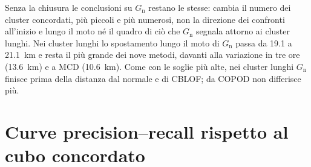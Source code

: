 Senza la chiusura le conclusioni su $G_{\mathrm{n}}$ restano le stesse: cambia il numero dei cluster concordati, più piccoli e più numerosi, non la direzione dei confronti all'inizio e lungo il moto né il quadro di ciò che $G_{\mathrm{n}}$ segnala attorno ai cluster lunghi. Nei cluster lunghi lo spostamento lungo il moto di $G_{\mathrm{n}}$ passa da 19.1 a 21.1~km e resta il più grande dei nove metodi, davanti alla variazione in tre ore (13.6~km) e a MCD (10.6~km). Come con le soglie più alte, nei cluster lunghi $G_{\mathrm{n}}$ finisce prima della distanza dal normale e di CBLOF; da COPOD non differisce più.

\section{Curve precision--recall rispetto al cubo concordato}
\label{app:soglia-pr}

